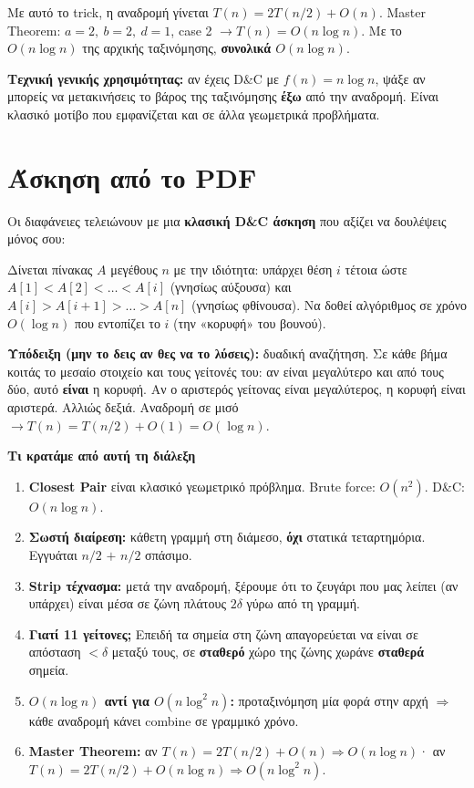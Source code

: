 \documentclass[11pt,a4paper]{article}
\begin{document}
Με αυτό το trick, η αναδρομή γίνεται $T(n) = 2 T(n/2) + O(n)$. Master Theorem:
$a = 2,\ b = 2,\ d = 1$, case 2 $\to T(n) = O(n \log n)$. Με το $O(n \log n)$
της αρχικής ταξινόμησης, \textbf{συνολικά $O(n \log n)$}.

\begin{keypoint}
\textbf{Τεχνική γενικής χρησιμότητας:} αν έχεις D\&C με $f(n) = n \log n$, ψάξε
αν μπορείς να μετακινήσεις το βάρος της ταξινόμησης \textbf{έξω} από την
αναδρομή. Είναι κλασικό μοτίβο που εμφανίζεται και σε άλλα γεωμετρικά
προβλήματα.
\end{keypoint}

\section{Άσκηση από το PDF}

Οι διαφάνειες τελειώνουν με μια \textbf{κλασική D\&C άσκηση} που αξίζει να
δουλέψεις μόνος σου:

\begin{quoteblock}
Δίνεται πίνακας $A$ μεγέθους $n$ με την ιδιότητα: υπάρχει θέση $i$ τέτοια ώστε
$A[1] < A[2] < \dots < A[i]$ (γνησίως αύξουσα) και $A[i] > A[i+1] > \dots > A[n]$
(γνησίως φθίνουσα). Να δοθεί αλγόριθμος σε χρόνο $O(\log n)$ που εντοπίζει το $i$
(την «κορυφή» του βουνού).
\end{quoteblock}

\textbf{Υπόδειξη (μην το δεις αν θες να το λύσεις):} δυαδική αναζήτηση. Σε κάθε
βήμα κοιτάς το μεσαίο στοιχείο και τους γείτονές του: αν είναι μεγαλύτερο και από
τους δύο, αυτό \textbf{είναι} η κορυφή. Αν ο αριστερός γείτονας είναι μεγαλύτερος,
η κορυφή είναι αριστερά. Αλλιώς δεξιά. Αναδρομή σε μισό $\to T(n) = T(n/2) +
O(1) = O(\log n)$.

\begin{recapbox}
\textbf{Τι κρατάμε από αυτή τη διάλεξη}
\begin{enumerate}
  \item \textbf{Closest Pair} είναι κλασικό γεωμετρικό πρόβλημα. Brute force:
  $O(n^2)$. D\&C: $O(n \log n)$.
  \item \textbf{Σωστή διαίρεση:} κάθετη γραμμή στη διάμεσο, \textbf{όχι} στατικά
  τεταρτημόρια. Εγγυάται $n/2$ $+$ $n/2$ σπάσιμο.
  \item \textbf{Strip τέχνασμα:} μετά την αναδρομή, ξέρουμε ότι το ζευγάρι που
  μας λείπει (αν υπάρχει) είναι μέσα σε ζώνη πλάτους $2\delta$ γύρω από τη
  γραμμή.
  \item \textbf{Γιατί 11 γείτονες;} Επειδή τα σημεία στη ζώνη απαγορεύεται να
  είναι σε απόσταση $< \delta$ μεταξύ τους, σε \textbf{σταθερό} χώρο της ζώνης
  χωράνε \textbf{σταθερά} σημεία.
  \item \textbf{$O(n \log n)$ αντί για $O(n \log^2 n)$:} προταξινόμηση μία φορά
  στην αρχή $\Rightarrow$ κάθε αναδρομή κάνει combine σε γραμμικό χρόνο.
  \item \textbf{Master Theorem:} αν $T(n) = 2T(n/2) + O(n) \Rightarrow
  O(n \log n)$· αν $T(n) = 2T(n/2) + O(n \log n) \Rightarrow O(n \log^2 n)$.
\end{enumerate}
\end{recapbox}

\lecturefooter
\end{document}
